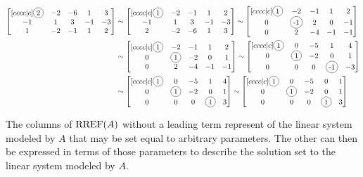 \begin{applicationActivities}{3}{5}
\begin{observation}
\begin{small}
\begin{align*}
\begin{bmatrix}[cccc|c]
\circledNumber{2} & -2 & -6 & 1 & 3 \\
-1 & 1 & 3 & -1 & -3 \\
1 & -2 & -1 & 1 & 2
\end{bmatrix} 
&\sim 
\begin{bmatrix}[cccc|c]
\circledNumber{1} & -2 & -1 & 1 & 2 \\
-1 & 1 & 3 & -1 & -3 \\
2 & -2 & -6 & 1 & 3 
\end{bmatrix} \sim
\begin{bmatrix}[cccc|c]
\circledNumber{1} & -2 & -1 & 1 & 2 \\
0 & \circledNumber{-1} & 2 & 0 & -1 \\
0 & 2 & -4 & -1 & -1 
\end{bmatrix} \\
&\sim
\begin{bmatrix}[cccc|c]
\circledNumber{1} & -2 & -1 & 1 & 2 \\
0 & \circledNumber{1} & -2 & 0  & 1 \\
0 & 2 & -4 & -1 & -1 
\end{bmatrix} 
\sim
\begin{bmatrix}[cccc|c]
\circledNumber{1} & 0 & -5 & 1 & 4 \\
0 & \circledNumber{1} & -2 & 0  & 1 \\
0 & 0 & 0 & \circledNumber{-1} & -3  
\end{bmatrix}  \\
&\sim 
\begin{bmatrix}[cccc|c]
\circledNumber{1} & 0 & -5 & 1 & 4 \\
0 & \circledNumber{1} & -2 & 0  & 1 \\
0 & 0 & 0 & \circledNumber{1} & 3  
\end{bmatrix} 
\sim 
\begin{bmatrix}[cccc|c]
\circledNumber{1} & 0 & -5 & 0 & 1 \\
0 & \circledNumber{1} & -2 & 0  & 1 \\
0 & 0 & 0 & \circledNumber{1} & 3  
\end{bmatrix}
\end{align*}
\end{small}

\end{observation}

\begin{definition}
  The columns of \(\operatorname{RREF}(A)\) without a leading term represent
   of the linear system modeled by \(A\)
  that may be set equal to arbitrary parameters.
  The other  can then be expressed in terms
  of those parameters to describe the solution set
  to the linear system modeled by \(A\).
\end{definition}


\end{applicationActivities}
